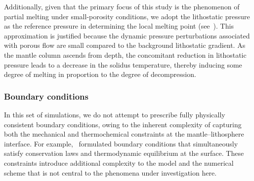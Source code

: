 Additionally, given that the primary focus of this study is the phenomenon of partial melting under small-porosity conditions, 
we adopt the lithostatic pressure as the reference pressure in determining the local melting point 
(see~\cite{MagmaDynamicsEnthalpyMethod}). 
This approximation is 
justified because the dynamic pressure perturbations associated with porous flow are small compared to the background 
lithostatic gradient. As the mantle column ascends from depth, the concomitant reduction in lithostatic pressure leads to 
a decrease in the solidus temperature, thereby inducing some degree of melting in proportion to the degree of decompression.

\subsubsection{Boundary conditions}

In this set of simulations, we do not attempt to prescribe fully physically consistent boundary conditions, 
owing to the inherent complexity of capturing both the mechanical and thermochemical constraints at the 
mantle–lithosphere interface. For example,~\cite{PartialMeltinginUpwellingMantleColumn} formulated boundary conditions that 
simultaneously satisfy conservation laws and thermodynamic equilibrium at the surface. 
These constraints introduce additional complexity to the model and the numerical scheme that is not central 
to the phenomena under investigation here.

